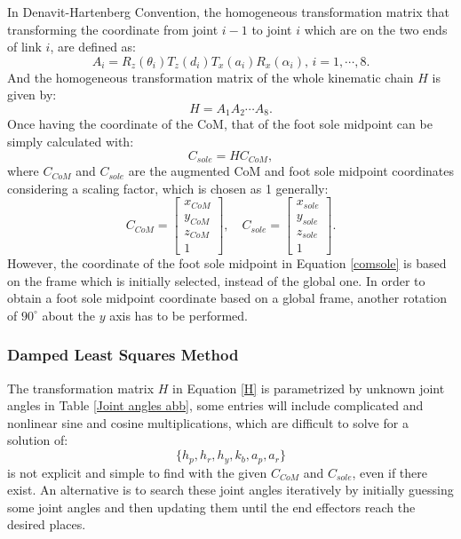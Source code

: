 In Denavit-Hartenberg Convention, the homogeneous transformation matrix that transforming the coordinate from joint $ i-1 $ to joint $ i $ which are on the two ends of link $ i $, are defined as:
\begin{equation}
A_i=R_z(\theta_i)T_z(d_i)T_x(a_i)R_x(\alpha_i),\,i=1,\cdots, 8.
\end{equation}
And the homogeneous transformation matrix of the whole kinematic chain $ H $ is given by:
\begin{equation}
\label{H}
H=A_1A_2\cdots A_8.
\end{equation}
Once having the coordinate of the CoM, that of the foot sole midpoint can be simply calculated with:
\begin{equation}
\label{comsole}
C_{sole}= HC_{CoM},
\end{equation}
where $ C_{CoM} $ and $ C_{sole} $ are the augmented CoM and foot sole midpoint coordinates considering a scaling factor, which is chosen as 1 generally:
\begin{equation*}
C_{CoM}=
\begin{bmatrix}
x_{CoM}\\y_{CoM}\\z_{CoM}\\1
\end{bmatrix},
\quad
C_{sole}=
\begin{bmatrix}
x_{sole}\\y_{sole}\\z_{sole}\\1
\end{bmatrix}.
\end{equation*}
However, the coordinate of the foot sole midpoint in Equation {\ref{comsole}} is based on the frame which is initially selected, instead of the global one. In order to obtain a foot sole midpoint coordinate based on a global frame, another rotation of $ 90^{\circ} $ about the $ y $ axis has to be performed.

\subsubsection{Damped Least Squares Method}
The transformation matrix $ H $ in Equation {\ref{H}} is parametrized by unknown joint angles in Table {\ref{Joint angles abb}}, some entries will include complicated and nonlinear sine and cosine multiplications, which are difficult to solve for a solution of: 
\begin{equation*}
\{h_p,h_r,h_y,k_b,a_p,a_r\}
\end{equation*}
is not explicit and simple to find with the given $ C_{CoM} $ and $ C_{sole} $, even if there exist. An alternative is to search these joint angles iteratively by initially guessing some joint angles and then updating them until the end effectors reach the desired places. 

